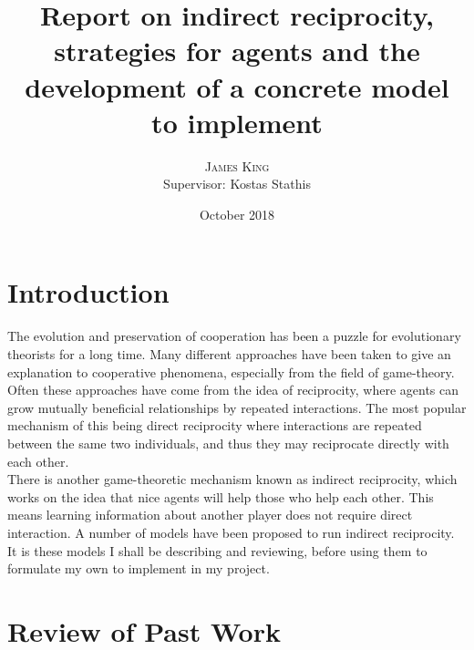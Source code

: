 \documentclass[twoside,twocolumn]{article}
\title{ Report on indirect reciprocity, strategies for agents and the development of a concrete model to implement} %
\author{%
\textsc{James King} \\%
\normalsize Supervisor: Kostas Stathis \\ %
}
\date{October 2018} %
\begin{document}



\maketitle


\section{Introduction}
The evolution and preservation of cooperation has been a puzzle for evolutionary theorists for a long time. Many different approaches have been taken to give an explanation to cooperative phenomena, especially from the field of game-theory. Often these approaches have come from the idea of reciprocity, where agents can grow mutually beneficial relationships by repeated interactions. The most popular mechanism of this being direct reciprocity where interactions are repeated between the same two individuals, and thus they may reciprocate directly with each other.\\
There is another game-theoretic mechanism known as indirect reciprocity, which works on the idea that nice agents will help those who help each other. This means learning information about another player does not require direct interaction. A number of models have been proposed to run indirect reciprocity. It is these models I shall be describing and reviewing, before using them to formulate my own to implement in my project.



\section{Review of Past Work}
\end{document}
